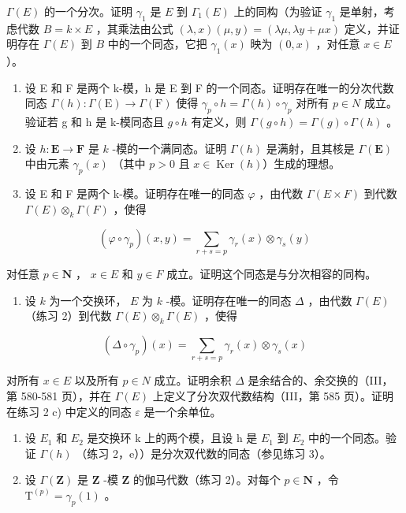 \(\Gamma(E)\) 的一个分次。证明 \(\gamma_{1}\) 是 \(E\) 到 \(\Gamma_{1}(E)\) 上的同构（为验证 \(\gamma_{1}\) 是单射，考虑代数 \(B = k \times E\) ，其乘法由公式 \((\lambda, x)(\mu, y) = (\lambda \mu, \lambda y + \mu x)\) 定义，并证明存在 \(\Gamma(E)\) 到 \(B\) 中的一个同态，它把 \(\gamma_{1}(x)\) 映为 \((0, x)\) ，对任意 \(x \in E\)）。

\begin{enumerate}
\def\labelenumi{\alph{enumi})}
\setcounter{enumi}{4}
\item
  设 E 和 F 是两个 k-模，h 是 E 到 F 的一个同态。证明存在唯一的分次代数同态 \(\Gamma(h):\Gamma(\mathrm{E})\to\Gamma(\mathrm{F})\) 使得 \(\gamma_{p}\circ h=\Gamma(h)\circ\gamma_{p}\) 对所有 \(p\in N\) 成立。验证若 g 和 h 是 k-模同态且 \(g\circ h\) 有定义，则 \(\Gamma(g\circ h)=\Gamma(g)\circ\Gamma(h)\) 。
\item
  设 \(h: \mathbf{E} \to \mathbf{F}\) 是 \(k\) -模的一个满同态。证明 \(\Gamma(h)\) 是满射，且其核是 \(\Gamma(\mathbf{E})\) 中由元素 \(\gamma_p(x)\) （其中 \(p > 0\) 且 \(x \in \operatorname{Ker}(h)\)）生成的理想。
\item
  设 E 和 F 是两个 k-模。证明存在唯一的同态 \(\varphi\) ，由代数 \(\Gamma(E \times F)\) 到代数 \(\Gamma(E) \otimes_{k} \Gamma(F)\) ，使得
\end{enumerate}

\[
(\varphi \circ \gamma_ {p}) (x, y) = \sum_ {r + s = p} \gamma_ {r} (x) \otimes \gamma_ {s} (y)
\]

对任意 \(p \in \mathbf{N}\) ， \(x \in E\) 和 \(y \in F\) 成立。证明这个同态是与分次相容的同构。

\begin{enumerate}
\def\labelenumi{\arabic{enumi})}
\setcounter{enumi}{2}
\tightlist
\item
  设 \(k\) 为一个交换环， \(E\) 为 \(k\) -模。证明存在唯一的同态 \(\Delta\) ，由代数 \(\Gamma(E)\) （练习 2）到代数 \(\Gamma(E) \otimes_k \Gamma(E)\) ，使得
\end{enumerate}

\[
(\Delta \circ \gamma_ {p}) (x) = \sum_ {r + s = p} \gamma_ {r} (x) \otimes \gamma_ {s} (x)
\]

对所有 \(x \in E\) 以及所有 \(p \in N\) 成立。证明余积 \(\Delta\) 是余结合的、余交换的（III，第 580-581 页），并在 \(\Gamma(E)\) 上定义了分次双代数结构（III，第 585 页）。证明在练习 2 c) 中定义的同态 \(\varepsilon\) 是一个余单位。

\begin{enumerate}
\def\labelenumi{\arabic{enumi})}
\setcounter{enumi}{3}
\item
  设 \(E_{1}\) 和 \(E_{2}\) 是交换环 k 上的两个模，且设 h 是 \(E_{1}\) 到 \(E_{2}\) 中的一个同态。验证 \(\Gamma(h)\) （练习 2，e））是分次双代数的同态（参见练习 3）。
\item
  设 \(\Gamma(\mathbf{Z})\) 是 \(\mathbf{Z}\) -模 \(\mathbf{Z}\) 的伽马代数（练习 2）。对每个 \(p \in \mathbf{N}\) ，令 \(\mathrm{T}^{(p)} = \gamma_p(1)\) 。
\end{enumerate}

